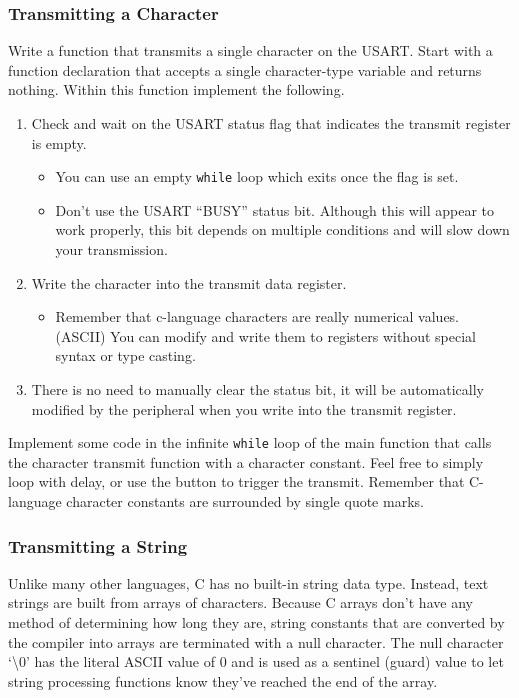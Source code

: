 \documentclass[openany,11pt,fleqn]{book} %
\begin{document}
\subsubsection{Transmitting a Character}

Write a function that transmits a single character on the USART. Start with a function declaration that accepts a single character-type variable and returns nothing. Within this function implement the following.

\begin{enumerate}
    \item Check and wait on the USART status flag that indicates the transmit register is empty.
    \begin{itemize}
        \item You can use an empty \texttt{while} loop which exits once the flag is set. 
        \item Don't use the USART ``BUSY'' status bit. Although this will appear to work properly, this bit depends on multiple conditions and will slow down your transmission. 
    \end{itemize}
    \item Write the character into the transmit data register. 
    \begin{itemize}
        \item Remember that c-language characters are really numerical values. (ASCII) You can modify and write them to registers without special syntax or type casting.  
    \end{itemize}
    \item There is no need to manually clear the status bit, it will be automatically modified by the peripheral when you write into the transmit register.
\end{enumerate}

Implement some code in the infinite \texttt{while} loop of the main function that calls the character transmit function with a character constant. Feel free to simply loop with delay, or use the button to trigger the transmit. Remember that C-language character constants are surrounded by single quote marks.

\subsubsection{Transmitting a String}
Unlike many other languages, C has no built-in string data type. Instead, text strings are built from arrays of characters. Because C arrays don't have any method of determining how long they are, string constants that are converted by the compiler into arrays are terminated with a null character. The null character `{\textbackslash}0' has the literal ASCII value of 0 and is used as a sentinel (guard) value to let string processing functions know they've reached the end of the array. 
\end{document}
